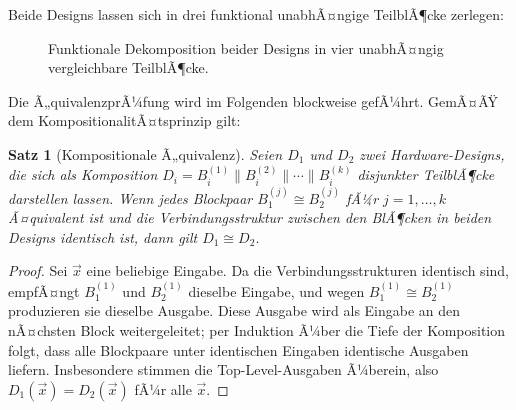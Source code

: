 ﻿\documentclass[12pt,a4paper]{report}
\newtheorem{theorem}{Satz}[section]
\begin{document}
Beide Designs lassen sich in drei funktional unabhÃ¤ngige TeilblÃ¶cke zerlegen:

\begin{figure}[H]
	\centering
	\caption{Funktionale Dekomposition beider Designs in vier unabhÃ¤ngig vergleichbare TeilblÃ¶cke.}
	\label{fig:dekomposition}
\end{figure}

Die Ã„quivalenzprÃ¼fung wird im Folgenden blockweise gefÃ¼hrt.  GemÃ¤ÃŸ dem
KompositionalitÃ¤tsprinzip gilt:

\begin{theorem}[Kompositionale Ã„quivalenz]
	\label{thm:kompositional}
	Seien $D_1$ und $D_2$ zwei Hardware-Designs, die sich als Komposition
	$D_i = B_i^{(1)} \parallel B_i^{(2)} \parallel \cdots \parallel B_i^{(k)}$
	disjunkter TeilblÃ¶cke darstellen lassen.  Wenn jedes Blockpaar
	$B_1^{(j)} \cong B_2^{(j)}$ fÃ¼r $j = 1,\ldots,k$ Ã¤quivalent ist und die
	Verbindungsstruktur zwischen den BlÃ¶cken in beiden Designs identisch ist, dann
	gilt $D_1 \cong D_2$.
\end{theorem}

\begin{proof}
	Sei $\vec{x}$ eine beliebige Eingabe.  Da die Verbindungsstrukturen identisch
	sind, empfÃ¤ngt $B_1^{(1)}$ und $B_2^{(1)}$ dieselbe Eingabe, und wegen
	$B_1^{(1)} \cong B_2^{(1)}$ produzieren sie dieselbe Ausgabe.  Diese Ausgabe
	wird als Eingabe an den nÃ¤chsten Block weitergeleitet; per Induktion Ã¼ber die
	Tiefe der Komposition folgt, dass alle Blockpaare unter identischen Eingaben
	identische Ausgaben liefern.  Insbesondere stimmen die Top-Level-Ausgaben
	Ã¼berein, also $D_1(\vec{x}) = D_2(\vec{x})$ fÃ¼r alle $\vec{x}$.
\end{proof}
\end{document}
